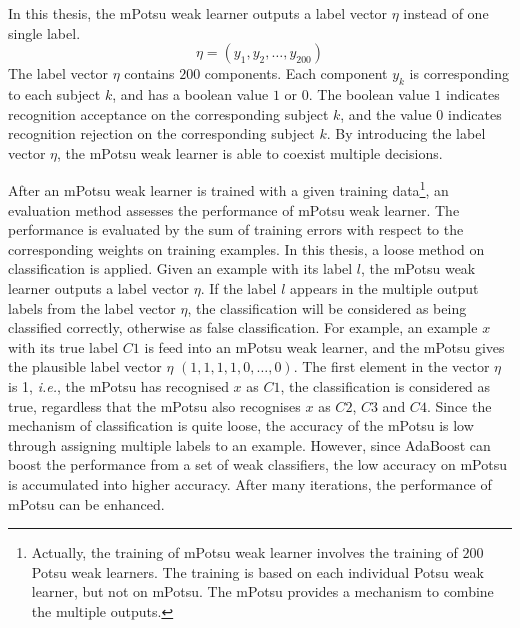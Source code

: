 In this thesis, the mPotsu weak learner outputs a label vector $\eta$ instead of one single label.
\begin{equation}
 \eta = (y_1, y_2, \ldots,y_{200})
\end{equation}
The label vector $\eta$ contains $200$ components. Each component $y_k$ is corresponding to each subject $k$, and has a boolean value $1$ or $0$. The boolean value $1$ indicates recognition acceptance on the corresponding subject $k$, and the value $0$ indicates recognition rejection on the corresponding subject $k$. By introducing the label vector $\eta$, the mPotsu weak learner is able to coexist multiple decisions.

After an mPotsu weak learner is trained with a given training data\footnote{Actually, the training of mPotsu weak learner involves the training of $200$ Potsu weak learners. The training is based on each individual Potsu weak learner, but not on mPotsu. The mPotsu provides a mechanism to combine the multiple outputs.}, an evaluation method assesses the performance of mPotsu weak learner. The performance is evaluated by the sum of training errors with respect to the corresponding weights on training examples. In this thesis, a loose method on classification is applied. Given an example with its label $l$, the mPotsu weak learner outputs a label vector $\eta$. If the label $l$ appears in the multiple output labels from the label vector $\eta$, the classification will be considered as being classified correctly, otherwise as false classification. For example, an example $x$ with its true label $C1$ is feed into an mPotsu weak learner, and the mPotsu gives the plausible label vector $\eta$ $(1,1,1,1,0,\ldots,0)$. The first element in the vector $\eta$ is 1, \textit{i.e.}, the mPotsu has recognised $x$ as $C1$, the classification is considered as true, regardless that the mPotsu also recognises $x$ as $C2$, $C3$ and $C4$. Since the mechanism of classification is quite loose, the accuracy of the mPotsu is low through assigning multiple labels to an example. However, since AdaBoost can boost the performance from a set of weak classifiers, the low accuracy on mPotsu is accumulated into higher accuracy. After many iterations, the performance of mPotsu can be enhanced.

